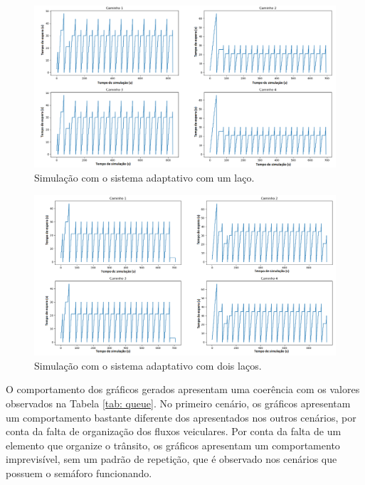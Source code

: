 \begin{figure}[H]
    \begin{center}
    \includegraphics[width=1.0\textwidth]{figuras/Queue_Duration_With_One_Loop.PNG}
    \end{center}
    \caption[Duração das filas, cenário 3]{Simulação com o sistema adaptativo com um laço.}
    \label{queueOneLoop}
\end{figure}

\begin{figure}[H]
    \begin{center}
    \includegraphics[width=1.0\textwidth]{figuras/Queue_Duration_With_Two_Loop.PNG}
    \end{center}
    \caption[Duração das filas, cenário 4]{Simulação com o sistema adaptativo com dois laços.}
    \label{queueTwoLoop}
\end{figure}

O comportamento dos gráficos gerados apresentam uma coerência com os valores observados na Tabela \ref{tab: queue}. No primeiro cenário, os gráficos apresentam um comportamento bastante diferente dos apresentados nos outros cenários, por conta da falta de organização dos fluxos veiculares. Por conta da falta de um elemento que organize o trânsito, os gráficos apresentam um comportamento imprevisível, sem um padrão de repetição, que é observado nos cenários que possuem o semáforo funcionando.

